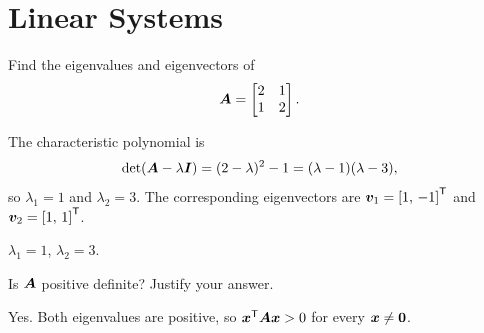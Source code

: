 \section{Linear Systems}

\begin{problem}[Eigenvalues][10]
Find the eigenvalues and eigenvectors of
\[
  \bm{A}=\begin{bmatrix} 2 & 1\\ 1 & 2\end{bmatrix}.
\]
\end{problem}

\begin{solution}
The characteristic polynomial is
\[
  \det(\bm{A}-\lambda\bm{I}) = (2-\lambda)^2-1 = (\lambda-1)(\lambda-3),
\]
so $\lambda_1=1$ and $\lambda_2=3$. The corresponding eigenvectors are
$\bm{v}_1={[1,\,-1]}^{\mathsf{T}}$ and $\bm{v}_2={[1,\,1]}^{\mathsf{T}}$.

\begin{resultbox}[Answer]
$\lambda_1=1$, \quad $\lambda_2=3$.
\end{resultbox}
\end{solution}

\begin{problem}
Is $\bm{A}$ positive definite? Justify your answer.
\end{problem}

\begin{solution}
Yes. Both eigenvalues are positive, so ${\bm{x}}^{\mathsf{T}}\bm{A}\bm{x}>0$ for every $\bm{x}\neq\bm{0}$.
\end{solution}
